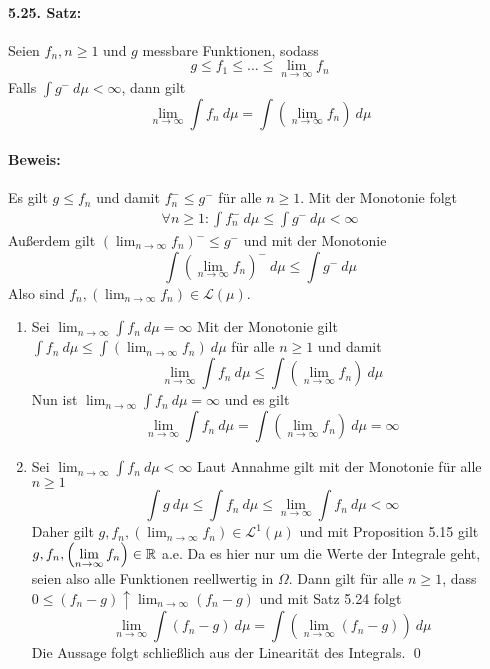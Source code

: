  \paragraph{5.25. Satz:}Seien $f_n,n\geq1$ und $g$ messbare Funktionen, sodass 
 $$g\leq f_1\leq\hdots\leq\lim_{n\to\infty}f_n$$
 Falls $\int g^-\ d\mu<\infty$, dann gilt
 $$\lim_{n\to\infty}\int f_n\ d\mu=\int \left(\lim_{n\to\infty}f_n\right)\ d\mu$$
 
 \paragraph{Beweis:} Es gilt $g\leq f_n$ und damit $f_n^-\leq g^-$ f\"ur alle $n\geq1$. Mit der Monotonie folgt
 \begin{align*}
     \forall n\geq1:\int f_n^-\ d\mu\leq \int g^-\ d\mu<\infty
 \end{align*}
 Au\ss{}erdem gilt $\displaystyle\left(\lim_{n\to\infty}f_n\right)^-\leq g^-$ und mit der Monotonie
$$\int \left(\lim_{n\to\infty}f_n\right)^-\ d\mu\leq \int g^-\ d\mu$$
Also sind $\displaystyle f_n,\left(\lim_{n\to\infty}f_n\right)\in\mathcal{L}(\mu)$. 
 \begin{enumerate}[label=\Roman*.]
     \item Sei $\lim_{n\to\infty}\int f_n\ d\mu=\infty$\newline
     Mit der Monotonie gilt $\int f_n\ d\mu\leq \int\left(\lim_{n\to\infty}f_n\right)\ d\mu$ f\"ur alle $n\geq1$ und damit 
     $$\lim_{n\to\infty}\int f_n\ d\mu\leq \int\left(\lim_{n\to\infty}f_n\right)\ d\mu$$
     Nun ist $\lim_{n\to\infty}\int f_n\ d\mu=\infty$ und es gilt 
     $$\lim_{n\to\infty}\int f_n\ d\mu=\int\left(\lim_{n\to\infty}f_n\right)\ d\mu=\infty$$
     \item Sei $\lim_{n\to\infty}\int f_n\ d\mu<\infty$\newline
     Laut Annahme gilt mit der Monotonie f\"ur alle $n\geq1$
     $$\int g\ d\mu\leq\int f_n\ d\mu\leq\lim_{n\to\infty}\int f_n\ d\mu<\infty$$
     Daher gilt $\displaystyle g,f_n,\left(\lim_{n\to\infty}f_n\right)\in\mathcal{L}^1(\mu)$ und mit Proposition 5.15 gilt $\displaystyle g,f_n,\left(\lim_{n\to\infty}f_n\right)\in\mathbb{R}$ a.e. Da es hier nur um die Werte der Integrale geht, seien also alle Funktionen reellwertig in $\Omega$. Dann gilt f\"ur alle $n\geq1$, dass $0\leq(f_n-g)\uparrow \displaystyle\lim_{n\to\infty}(f_n-g)$ und mit Satz 5.24 folgt
     $$\lim_{n\to\infty}\int (f_n-g)\ d\mu=\int\left(\lim_{n\to\infty}(f_n-g)\right)\ d\mu$$ 
     Die Aussage folgt schlie\ss{}lich aus der Linearit\"at des Integrals. \qed
 \end{enumerate}
 

